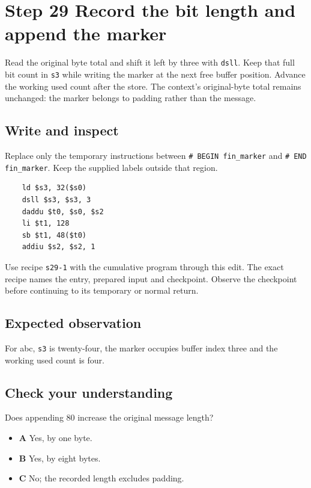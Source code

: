 \section{Step 29 Record the bit length and append the marker}\label{sha-s29}

Read the original byte total and shift it left by three with \texttt{dsll}. Keep that full bit count in \texttt{s3} while writing the marker at the next free buffer position. Advance the working used count after the store. The context's original-byte total remains unchanged: the marker belongs to padding rather than the message.

\subsection{Write and inspect}
Replace only the temporary instructions between \texttt{\# BEGIN fin\_marker} and \texttt{\# END fin\_marker}. Keep the supplied labels outside that region.

\begin{verbatim}
    ld $s3, 32($s0)
    dsll $s3, $s3, 3
    daddu $t0, $s0, $s2
    li $t1, 128
    sb $t1, 48($t0)
    addiu $s2, $s2, 1
\end{verbatim}

Use recipe \texttt{s29-1} with the cumulative program through this edit. The exact recipe names the entry, prepared input and checkpoint. Observe the checkpoint before continuing to its temporary or normal return.

\subsection{Expected observation}
For abc, \texttt{s3} is twenty-four, the marker occupies buffer index three and the working used count is four.

\subsection{Check your understanding}
Does appending 80 increase the original message length?

\begin{itemize}
\item \textbf{A} Yes, by one byte.
\item \textbf{B} Yes, by eight bytes.
\item \textbf{C} No; the recorded length excludes padding.
\end{itemize}
